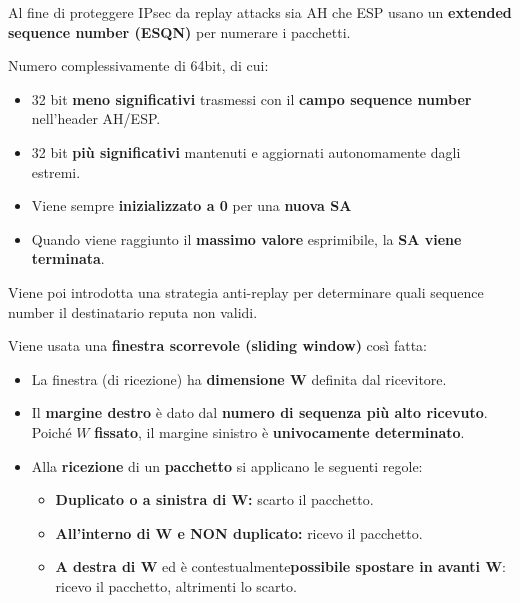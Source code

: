\begin{note}
Al fine di proteggere IPsec da replay attacks sia AH che ESP usano un \textbf{extended sequence number (ESQN)} per numerare i pacchetti.
\end{note}
\begin{definition}[ESQN]\label{def:esqn}
Numero complessivamente di 64bit, di cui:
\begin{itemize}
    \item 32 bit \textbf{meno significativi} trasmessi con il \textbf{campo sequence number} nell'header AH/ESP.\footnotemark {}
    \item 32 bit \textbf{più significativi} mantenuti e aggiornati autonomamente dagli estremi.
    \item Viene sempre \textbf{inizializzato a 0} per una \textbf{nuova SA}
    \item Quando viene raggiunto il \textbf{massimo valore} esprimibile, la \textbf{SA viene terminata}.
\end{itemize}
\end{definition}
Viene poi introdotta una strategia anti-replay per determinare quali sequence number il destinatario reputa non validi.
\begin{theorem}\label{thm:antireplay}
Viene usata una \textbf{finestra scorrevole (sliding window)} così fatta:
\begin{itemize}
    \item La finestra (di ricezione) ha \textbf{dimensione W} definita dal ricevitore.
    \item Il \textbf{margine destro} è dato dal \textbf{numero di sequenza più alto ricevuto}. Poiché $W$ \textbf{fissato}, il margine sinistro è \textbf{univocamente determinato}.
    \item Alla \textbf{ricezione} di un \textbf{pacchetto} si applicano le seguenti regole:
    \begin{itemize}
        \item \textbf{Duplicato o a sinistra di W:} scarto il pacchetto.
        \item \textbf{All'interno di W e NON duplicato:} ricevo il pacchetto.
        \item \textbf{A destra di W} ed è contestualmente\footnotemark \textbf{possibile spostare in avanti W}: ricevo il pacchetto, altrimenti lo scarto.
    \end{itemize}
\end{itemize}

\end{theorem}\pagebreak
